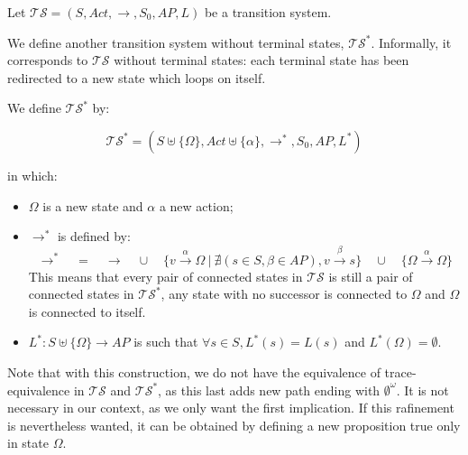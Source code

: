 \documentclass[11pt,a4paper]{article}
\def\ts{\mathcal{TS}}
\def\tss{\mathcal{TS^*}}
\begin{document}
\begin{Answer}
\Question%
Let $\ts=(S,\mathit{Act},\rightarrow,S_0,\mathit{AP},L)$ be a transition system.

We define another transition system without terminal states, $\tss$. Informally, it corresponds to $\ts$ without terminal states: each terminal state has been redirected to a new state which loops on itself.

We define $\ts^*$ by:

$$\tss=(S\uplus\{\Omega\},\mathit{Act}\uplus\{\alpha\},\rightarrow^*,S_0,\mathit{AP},L^*)$$

in which:
\begin{itemize}
	\item $\Omega$ is a new state and $\alpha$ a new action;
	\item $\rightarrow^*$ is defined by:
		$$\rightarrow^*\quad=\quad\rightarrow\quad\cup\quad\{v\xrightarrow{\alpha} \Omega~|~\nexists (s\in S, \beta\in\mathit{AP}), v\xrightarrow{\beta}s\}\quad\cup\quad\{\Omega\xrightarrow{\alpha}\Omega\}$$%
		This means that every pair of connected states in $\mathcal{TS}$ is still a pair of connected states in $\mathcal{TS^*}$, any state with no successor is connected to $\Omega$ and $\Omega$ is connected to itself.
	\item $L^* : S\uplus\{\Omega\} \to \mathit{AP}$ is such that $\forall s\in S,  L^*(s) = L(s)$ and $L^*(\Omega) = \emptyset$.
\end{itemize}

Note that with this construction, we do not have the equivalence of trace-equivalence in $\ts$ and $\tss$, as this last adds new path ending with $\emptyset^\omega$.
It is not necessary in our context, as we only want the first implication. If this rafinement is nevertheless wanted, it can be obtained by defining a new proposition true only in state $\Omega$. %


\end{Answer}
\end{document}
